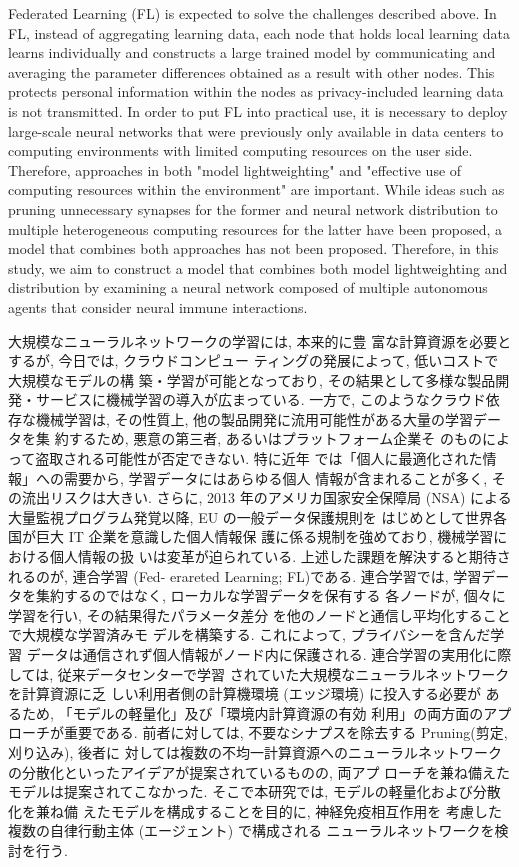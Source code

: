Federated Learning (FL) is expected to solve the challenges described above. In FL, instead of aggregating learning data, each node that holds local learning data learns individually and constructs a large trained model by communicating and averaging the parameter differences obtained as a result with other nodes. This protects personal information within the nodes as privacy-included learning data is not transmitted.
In order to put FL into practical use, it is necessary to deploy large-scale neural networks that were previously only available in data centers to computing environments with limited computing resources on the user side. Therefore, approaches in both "model lightweighting" and "effective use of computing resources within the environment" are important. While ideas such as pruning unnecessary synapses for the former and neural network distribution to multiple heterogeneous computing resources for the latter have been proposed, a model that combines both approaches has not been proposed.
Therefore, in this study, we aim to construct a model that combines both model lightweighting and distribution by examining a neural network composed of multiple autonomous agents that consider neural immune interactions.

\clearpage
大規模なニューラルネットワークの学習には, 本来的に豊 富な計算資源を必要とするが, 今日では, クラウドコンピュー ティングの発展によって, 低いコストで大規模なモデルの構 築・学習が可能となっており, その結果として多様な製品開 発・サービスに機械学習の導入が広まっている.
一方で, このようなクラウド依存な機械学習は, その性質上, 他の製品開発に流用可能性がある大量の学習データを集 約するため, 悪意の第三者, あるいはプラットフォーム企業そ のものによって盗取される可能性が否定できない. 特に近年 では「個人に最適化された情報」への需要から, 学習データにはあらゆる個人 情報が含まれることが多く, その流出リスクは大きい.
さらに, 2013 年のアメリカ国家安全保障局 (NSA) による 大量監視プログラム発覚以降, EU の一般データ保護規則を はじめとして世界各国が巨大 IT 企業を意識した個人情報保 護に係る規制を強めており, 機械学習における個人情報の扱 いは変革が迫られている.
上述した課題を解決すると期待されるのが, 連合学習 (Fed- erareted Learning; FL)である. 連合学習では, 学習デー タを集約するのではなく, ローカルな学習データを保有する 各ノードが, 個々に学習を行い, その結果得たパラメータ差分 を他のノードと通信し平均化することで大規模な学習済みモ デルを構築する. これによって, プライバシーを含んだ学習 データは通信されず個人情報がノード内に保護される.
連合学習の実用化に際しては, 従来データセンターで学習 されていた大規模なニューラルネットワークを計算資源に乏 しい利用者側の計算機環境 (エッジ環境) に投入する必要が あるため, 「モデルの軽量化」及び「環境内計算資源の有効 利用」の両方面のアプローチが重要である. 前者に対しては, 不要なシナプスを除去する Pruning(剪定, 刈り込み), 後者に 対しては複数の不均一計算資源へのニューラルネットワーク の分散化といったアイデアが提案されているものの, 両アプ ローチを兼ね備えたモデルは提案されてこなかった.
そこで本研究では, モデルの軽量化および分散化を兼ね備 えたモデルを構成することを目的に, 神経免疫相互作用を 考慮した複数の自律行動主体 (エージェント) で構成される ニューラルネットワークを検討を行う.

